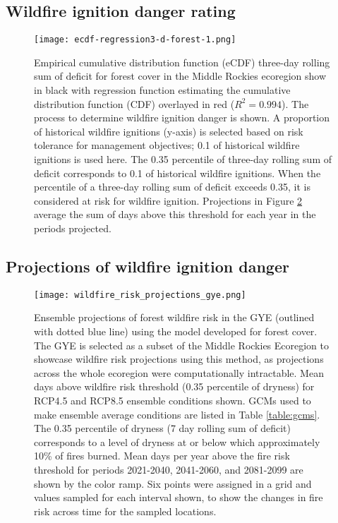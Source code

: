 \documentclass[11p]{article}
\begin{document}
\subsection{Wildfire ignition danger rating}



\begin{figure}[!htbp]
  \centering
  \texttt{[image: ecdf-regression3-d-forest-1.png]}
  \caption{Empirical cumulative distribution function (eCDF) three-day rolling sum of deficit for forest cover in the Middle Rockies ecoregion show in black with regression function estimating the cumulative distribution function (CDF) overlayed in red ($R^2 = 0.994$). The process to determine wildfire ignition danger is shown. A proportion of historical wildfire ignitions (y-axis) is selected based on risk tolerance for management objectives; 0.1 of historical wildfire ignitions is used here. The 0.35 percentile of three-day rolling sum of deficit corresponds to 0.1 of historical wildfire ignitions. When the percentile of a three-day rolling sum of deficit exceeds 0.35, it is considered at risk for wildfire ignition. Projections in Figure \ref{fig:projected-risk} average the sum of days above this threshold for each year in the periods projected.}
  \label{fig:ecdf}
\end{figure}

\subsection{Projections of wildfire ignition danger}

\begin{figure}[htbp]
  \centering
  \texttt{[image: wildfire\_risk\_projections\_gye.png]}
  \caption{Ensemble projections of forest wildfire risk in the GYE (outlined with dotted blue line) using the model developed for forest cover. The GYE is selected as a subset of the Middle Rockies Ecoregion to showcase wildfire risk projections using this method, as projections across the whole ecoregion were computationally intractable. Mean days above wildfire risk threshold (0.35 percentile of dryness) for RCP4.5 and RCP8.5 ensemble conditions shown. GCMs used to make ensemble average conditions are listed in Table \ref{table:gcms}. The 0.35 percentile of dryness (7 day rolling sum of deficit) corresponds to a level of dryness at or below which approximately 10\% of fires burned. Mean days per year above the fire risk threshold for periods 2021-2040, 2041-2060, and 2081-2099 are shown by the color ramp. Six points were assigned in a grid and values sampled for each interval shown, to show the changes in fire risk across time for the sampled locations.}
  \label{fig:projected-risk}
\end{figure}
\end{document}

